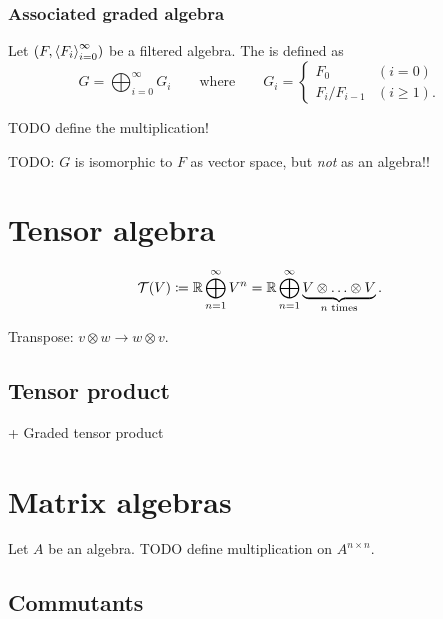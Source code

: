 \subsubsection{Associated graded algebra}
\begin{definition}
Let $\sSet{F,\seq{F_i}_{i=0}^\infty}$ be a filtered algebra. The  is defined as
\[ G = \bigoplus_{i=0}^\infty G_i \qquad\text{where}\qquad G_i = \begin{cases}
F_0 & (i=0) \\
F_{i}/F_{i-1} & (i \geq 1).
\end{cases} \]
\end{definition}
TODO define the multiplication!

TODO: $G$ is isomorphic to $F$ as vector space, but \emph{not} as an algebra!!


\section{Tensor algebra}
\[ \mathcal{T}(V) \coloneqq \mathbb{R} \bigoplus_{n=1}^\infty V^n = \mathbb{R} \bigoplus_{n=1}^\infty \underbrace{V\otimes \ldots \otimes V}_{\text{$n$ times}}. \]

Transpose: $v\otimes w \to w\otimes v$.

\subsection{Tensor product}
+ Graded tensor product

\section{Matrix algebras}
\begin{definition}
Let $A$ be an algebra. TODO define multiplication on $A^{n\times n}$.
\end{definition}

\subsection{Commutants}

